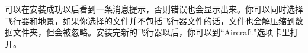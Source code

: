 可以在安装成功以后看到一条消息提示，否则错误也会显示出来。你可以同时选择飞行器和地景，如果你选择的文件并不包括飞行器文件的话，文件也会解压缩到数据文件夹，但会被忽略。安装完新的飞行器以后，你可以到``Aircraft''选项卡里打开。
\fi
%
%
